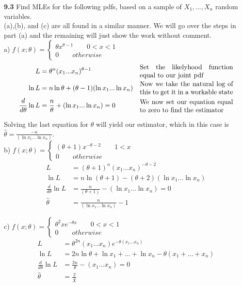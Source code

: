 

{\bf 9.3} Find MLEs for the following pdfs, based on a sample of $X_{1}, ..., X_{n}$ random variables. \\
(a),(b), and (c) are all found in a similar manner. We will go over the steps in part (a) and the remaining
will just show the work without comment. \\


a) $f(x;\theta )=\begin{cases} \theta { x }^{ \theta -1 }\qquad 0<x<1 \\ 0\qquad otherwise \end{cases}$\\

\begin{align*}
	L &=\theta^{n} (x_{1}...x_{n})^{ \theta -1} & \parbox[c]{0.4\linewidth} 
{Set the likelyhood function equal to our joint pdf} \\
	\ln L &= n\ln\theta+(\theta-1)(\ln x_{1}...\ln x_{n}) & \parbox[c]{0.4\linewidth} 
{Now we take the natural log of this to get it in a workable state} \\
	\frac{d}{d\theta}\ln L & =\frac{n}{\theta}+ ( \ln x_{1}...\ln x_{n} ) = 0 & \parbox[c]{0.4\linewidth} 
{We now set our equation equal to zero to find the estimator} \\
\end{align*}

Solving the last equation for $\theta$ will yield our estimator, which in this case is
$\hat{\theta}  =\frac{-n}{ ( \ln x_{1}... \ln x_{n} ) }$. \\


b) $f(x;\theta )=\begin{cases} (\theta +1) { x }^{  -\theta -2 }\qquad 1<x \\ 0\qquad otherwise \end{cases}$\\

\begin{align*}
	L & = ( \theta+1)^{n} (x_{1}...x_{n})^{ -\theta -2}\\
	\ln L & = n\ln (\theta+1)-(\theta+2)(\ln x_{1}...\ln x_{n})\\
	\frac{d}{d\theta}\ln L & = \frac{n}{(\theta+1)}-(\ln x_{1}...\ln x_{n})=0\\
	\hat{\theta} & = \frac{n}{(\ln x_{1}...\ln x_{n})}-1
\end{align*}


c) $f(x;\theta )=\begin{cases} \theta^{2} x{ e }^{ -\theta x }\qquad 0<x<1 \\ 0\qquad otherwise \end{cases}$\\

\begin{align*}
	L & =\theta^{2n}(x_{1}...x_{n})e^{-\theta(x_{1}...x_{n})}\\
	\ln L & = 2n\ln\theta+\ln x_{1}+...+\ln x_{n}-\theta(x_{1}+...+x_{n})\\
	\frac{d}{d\theta}\ln L & = \frac{2n}{\theta}-(x_{1}...x_{n})=0\\
	\hat{\theta} & = \frac{2}{\overline{X}} 
\end{align*}
\\

